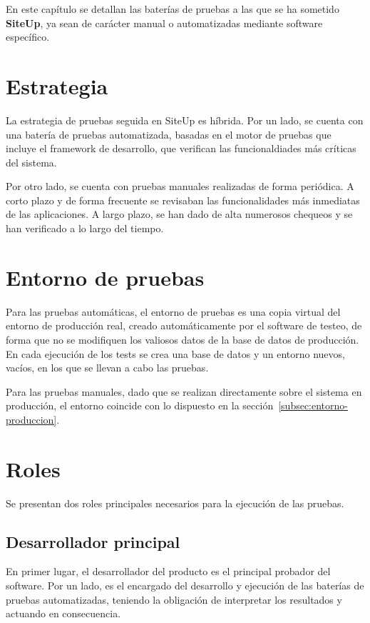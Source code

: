 En este capítulo se detallan las baterías de pruebas a las que se ha sometido
\textbf{SiteUp}, ya sean de carácter manual o automatizadas mediante software
específico.

\section{Estrategia}

La estrategia de pruebas seguida en SiteUp es híbrida. Por un lado, se cuenta
con una batería de pruebas automatizada, basadas en el motor de pruebas que
incluye el framework de desarrollo, que verifican las funcionaldiades más
críticas del sistema.

Por otro lado, se cuenta con pruebas manuales realizadas de forma periódica. A
corto plazo y de forma frecuente se revisaban las funcionalidades más inmediatas
de las aplicaciones. A largo plazo, se han dado de alta numerosos chequeos y se
han verificado a lo largo del tiempo.

\section{Entorno de pruebas}

Para las pruebas automáticas, el entorno de pruebas es una copia virtual del
entorno de producción real, creado automáticamente por el software de testeo, de
forma que no se modifiquen los valiosos datos de la base de datos de
producción. En cada ejecución de los tests se crea una base de datos y un
entorno nuevos, vacíos, en los que se llevan a cabo las pruebas.

Para las pruebas manuales, dado que se realizan directamente sobre el sistema en
producción, el entorno coincide con lo dispuesto en la
sección~\ref{subsec:entorno-produccion}.

\section{Roles}

Se presentan dos roles principales necesarios para la ejecución de las pruebas.

\subsection{Desarrollador principal}

En primer lugar, el desarrollador del producto es el principal probador del
software. Por un lado, es el encargado del desarrollo y ejecución de las
baterías de pruebas automatizadas, teniendo la obligación de interpretar los
resultados y actuando en consecuencia.

